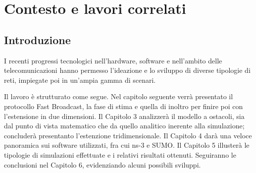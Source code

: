 %
\chapter{Contesto e lavori correlati}
%
\section{Introduzione}
%
I recenti progressi tecnologici nell'hardware, software e nell'ambito delle telecomunicazioni hanno permesso
l'ideazione e lo sviluppo di diverse tipologie di reti, impiegate poi in un'ampia gamma di scenari.
%
%

Il lavoro è strutturato come segue.
Nel capitolo seguente verrà presentato il protocollo Fast Broadcast, la fase di stima e quella di inoltro per finire poi con l'estensione in due dimensioni.
Il Capitolo 3 analizzerà il modello a ostacoli, sia dal punto di vista matematico che da quello analitico inerente alla simulazione;
concluderà presentanto l'estenzione tridimensionale.
Il Capitolo 4 darà una veloce panoramica sui software utilizzati, fra cui ns-3 e SUMO.
Il Capitolo 5 illusterà le tipologie di simulazioni effettuate e i relativi risultati ottenuti.
Seguiranno le conclusioni nel Capitolo 6, evidenziando alcuni possibili sviluppi.
%
